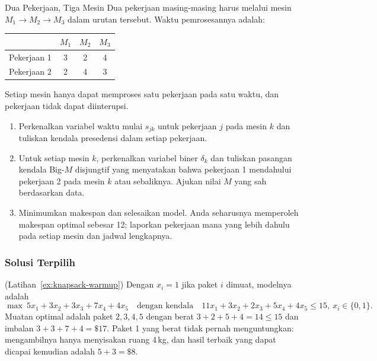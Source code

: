 \begin{ex}{Dua Pekerjaan, Tiga Mesin}{}
\label{ex:flowshop}
 Dua pekerjaan masing-masing harus melalui mesin $M_1 \to M_2 \to M_3$ dalam urutan tersebut. Waktu pemrosesannya adalah:

\begin{center}
\begin{tabular}{l|c|c|c}
 & $M_1$ & $M_2$ & $M_3$ \\
\hline
Pekerjaan 1 & 3 & 2 & 4 \\
Pekerjaan 2 & 2 & 4 & 3 \\
\end{tabular}
\par{}\label{tab:integerProgrammingFormulations-book1-tab07}%

\end{center}

Setiap mesin hanya dapat memproses satu pekerjaan pada satu waktu, dan pekerjaan tidak dapat diinterupsi.
\begin{enumerate}
\item Perkenalkan variabel waktu mulai $s_{jk}$ untuk pekerjaan $j$ pada mesin $k$ dan tuliskan kendala presedensi dalam setiap pekerjaan.
\item Untuk setiap mesin $k$, perkenalkan variabel biner $\delta_k$ dan tuliskan pasangan kendala Big-$M$ disjungtif yang menyatakan bahwa pekerjaan 1 mendahului pekerjaan 2 pada mesin $k$ atau sebaliknya. Ajukan nilai $M$ yang sah berdasarkan data.
\item Minimumkan makespan dan selesaikan model. Anda seharusnya memperoleh makespan optimal sebesar 12; laporkan pekerjaan mana yang lebih dahulu pada setiap mesin dan jadwal lengkapnya.
\end{enumerate}
\exrefs{\S\ref{sec:job-shop}, \S\ref{subsec:multi-term-disjunction}, \S\ref{subsec:big-M-activation}}
\end{ex}

\subsubsection*{Solusi Terpilih}

\begin{solution}(Latihan~\ref{ex:knapsack-warmup})
Dengan $x_i = 1$ jika paket $i$ dimuat, modelnya adalah
\[
\max\ 5x_1 + 3x_2 + 3x_3 + 7x_4 + 4x_5
\quad \text{dengan kendala} \quad
11x_1 + 3x_2 + 2x_3 + 5x_4 + 4x_5 \leq 15,\ x_i \in \{0,1\}.
\]
Muatan optimal adalah paket $2, 3, 4, 5$ dengan berat $3+2+5+4 = 14 \leq 15$ dan imbalan $3+3+7+4 = \$17$. Paket 1 yang berat tidak pernah menguntungkan: mengambilnya hanya menyisakan ruang 4\,kg, dan hasil terbaik yang dapat dicapai kemudian adalah $5 + 3 = \$8$.
\end{solution}

